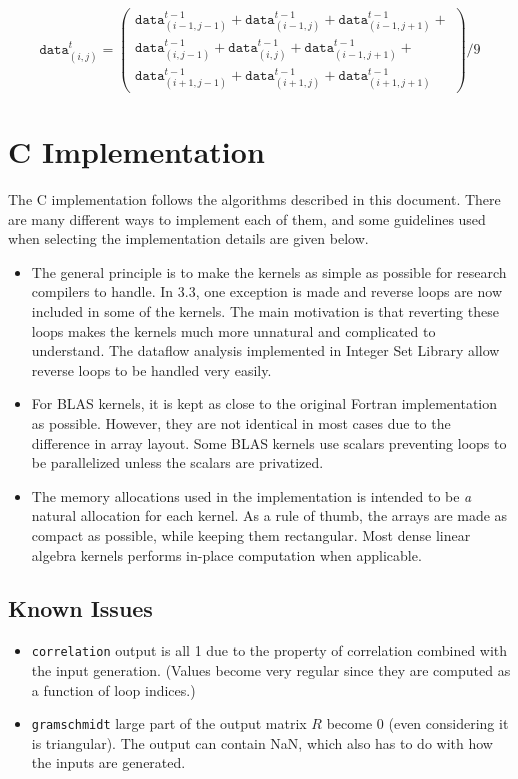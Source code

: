\documentclass{article}
\begin{document}
\[\mathtt{data}^{t}_{(i,j)} = \left(
\begin{array}{c}
   \mathtt{data}^{t-1}_{(i-1,j-1)} + \mathtt{data}^{t-1}_{(i-1,j)} +  \mathtt{data}^{t-1}_{(i-1,j+1)} + \\
   \mathtt{data}^{t-1}_{(i,j-1)} + \mathtt{data}^{t-1}_{(i,j)} +  \mathtt{data}^{t-1}_{(i-1,j+1)} + \\
    \mathtt{data}^{t-1}_{(i+1,j-1)} + \mathtt{data}^{t-1}_{(i+1,j)} + \mathtt{data}^{t-1}_{(i+1,j+1)}
\end{array}\right)/9\]

\section{C Implementation}
The C implementation follows the algorithms described in this document. There are many different ways
to implement each of them, and some guidelines used when selecting the implementation details are given below.


\begin{itemize}
\item The general principle is to make the kernels as simple as possible for
research compilers to handle.  In 3.3, one exception is made and reverse loops
are now included in some of the kernels. The main motivation is that reverting
these loops makes the kernels much more unnatural and complicated to
understand. The dataflow analysis implemented in Integer Set Library allow
reverse loops to be handled very easily. 
\item For BLAS kernels, it is kept as close to the original Fortran implementation as possible. 
However, they are not identical in most cases due to the difference in array layout. Some BLAS
kernels use scalars preventing loops to be parallelized unless the scalars are privatized.
\item The memory allocations used in the implementation is intended to be
\emph{a} natural allocation for each kernel. As a rule of thumb, the
arrays are made as compact as possible, while keeping them rectangular.
Most dense linear algebra kernels performs in-place computation when applicable.
\end{itemize}

\subsection*{Known Issues}
\begin{itemize}
\item {\tt correlation} output is all 1 due to the property of correlation
combined with the input generation. (Values become very regular since they are
computed as a function of loop indices.)
\item {\tt gramschmidt} large part of the output matrix $R$ become 0 (even
considering it is triangular). The output can contain NaN, which also has to do
with how the inputs are generated.
\end{itemize}
\end{document}
